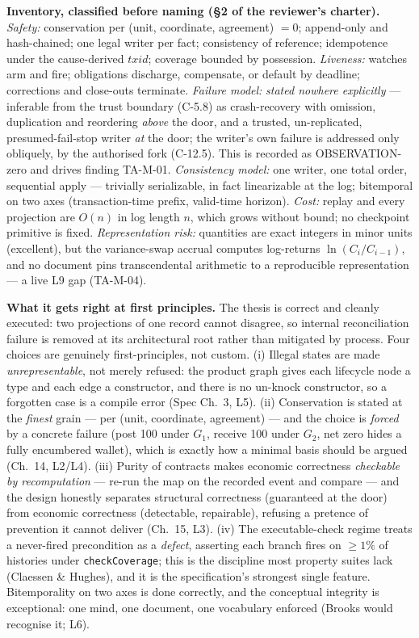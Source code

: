 \documentclass[11pt,a4paper]{article}
\begin{document}
\textbf{Inventory, classified before naming (§2 of the reviewer's charter).}
\emph{Safety:} conservation per (unit, coordinate, agreement) $=0$; append-only and
hash-chained; one legal writer per fact; consistency of reference; idempotence under the
cause-derived $\mathit{txid}$; coverage bounded by possession. \emph{Liveness:} watches arm
and fire; obligations discharge, compensate, or default by deadline; corrections and
close-outs terminate. \emph{Failure model:} \emph{stated nowhere explicitly} --- inferable
from the trust boundary (C-5.8) as crash-recovery with omission, duplication and reordering
\emph{above} the door, and a trusted, un-replicated, presumed-fail-stop writer \emph{at} the
door; the writer's own failure is addressed only obliquely, by the authorised fork (C-12.5).
This is recorded as OBSERVATION-zero and drives finding TA-M-01. \emph{Consistency model:}
one writer, one total order, sequential apply --- trivially serializable, in fact
linearizable at the log; bitemporal on two axes (transaction-time prefix, valid-time
horizon). \emph{Cost:} replay and every projection are $O(n)$ in log length $n$, which grows
without bound; no checkpoint primitive is fixed. \emph{Representation risk:} quantities are
exact integers in minor units (excellent), but the variance-swap accrual computes log-returns
$\ln(C_i/C_{i-1})$, and no document pins transcendental arithmetic to a reproducible
representation --- a live L9 gap (TA-M-04).

\textbf{What it gets right at first principles.} The thesis is correct and cleanly executed:
two projections of one record cannot disagree, so internal reconciliation failure is removed
at its architectural root rather than mitigated by process. Four choices are genuinely
first-principles, not custom. (i) Illegal states are made \emph{unrepresentable}, not merely
refused: the product graph gives each lifecycle node a type and each edge a constructor, and
there is no un-knock constructor, so a forgotten case is a compile error (Spec Ch.~3, L5). (ii)
Conservation is stated at the \emph{finest} grain --- per (unit, coordinate, agreement) ---
and the choice is \emph{forced} by a concrete failure (post 100 under $G_1$, receive 100 under
$G_2$, net zero hides a fully encumbered wallet), which is exactly how a minimal basis should
be argued (Ch.~14, L2/L4). (iii) Purity of contracts makes economic correctness
\emph{checkable by recomputation} --- re-run the map on the recorded event and compare --- and
the design honestly separates structural correctness (guaranteed at the door) from economic
correctness (detectable, repairable), refusing a pretence of prevention it cannot deliver
(Ch.~15, L3). (iv) The executable-check regime treats a never-fired precondition as a
\emph{defect}, asserting each branch fires on $\ge 1\%$ of histories under
\texttt{checkCoverage}; this is the discipline most property suites lack (Claessen \& Hughes),
and it is the specification's strongest single feature. Bitemporality on two axes is done
correctly, and the conceptual integrity is exceptional: one mind, one document, one vocabulary
enforced (Brooks would recognise it; L6).
\end{document}

